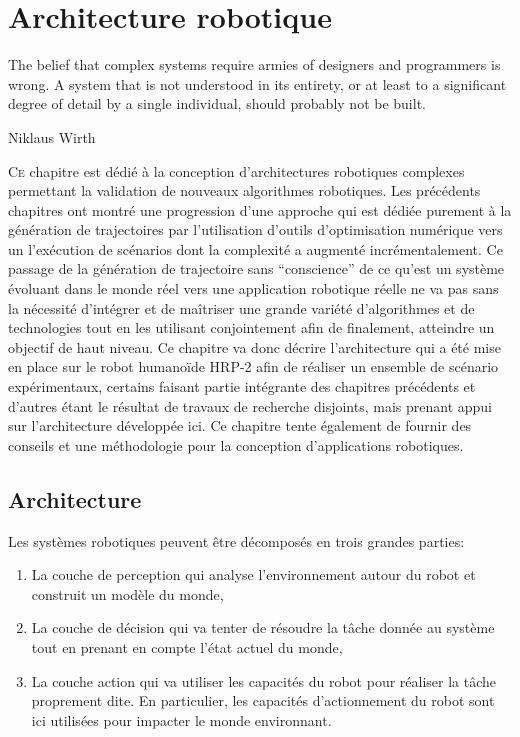 \chapter{Architecture robotique}
\label{chap:integration}

\epigraph{\foreignlanguage{USenglish}{The belief that complex systems
    require armies of designers and programmers is wrong. A system
    that is not understood in its entirety, or at least to a
    significant degree of detail by a single individual, should
    probably not be built.}}{Niklaus Wirth}
\clearpage

\lettrine[lines=2, lraise=0.1, nindent=0em, slope=-.5em]%
{C}{e} chapitre est dédié à la conception d'architectures robotiques
complexes permettant la validation de nouveaux algorithmes robotiques.
Les précédents chapitres ont montré une progression d'une approche qui
est dédiée purement à la génération de trajectoires par l'utilisation
d'outils d'optimisation numérique vers un l'exécution de scénarios
dont la complexité a augmenté incrémentalement. Ce passage de la
génération de trajectoire sans ``conscience'' de ce qu'est un système
évoluant dans le monde réel vers une application robotique réelle ne
va pas sans la nécessité d'intégrer et de maîtriser une grande variété
d'algorithmes et de technologies tout en les utilisant conjointement
afin de finalement, atteindre un objectif de haut niveau. Ce chapitre
va donc décrire l'architecture qui a été mise en place sur le robot
humanoïde HRP-2 afin de réaliser un ensemble de scénario
expérimentaux, certains faisant partie intégrante des chapitres
précédents et d'autres étant le résultat de travaux de recherche
disjoints, mais prenant appui sur l'architecture développée ici. Ce
chapitre tente également de fournir des conseils et une méthodologie
pour la conception d'applications robotiques.

\section{Architecture}


Les systèmes robotiques peuvent être décomposés en trois grandes
parties:

\begin{enumerate}
\item La couche de perception qui analyse
  l'environnement autour du robot et construit un modèle du monde,
\item La couche de décision qui va tenter de résoudre
  la tâche donnée au système tout en prenant en compte l'état actuel
  du monde,
\item La couche action qui va utiliser les capacités du robot pour
  réaliser la tâche proprement dite. En particulier, les capacités
  d'actionnement du robot sont ici utilisées pour impacter le monde
  environnant.
\end{enumerate}


